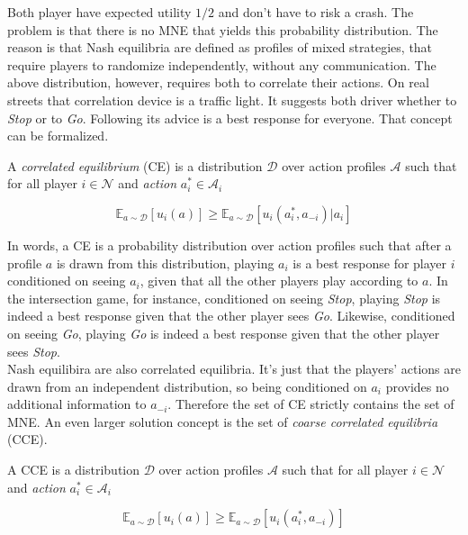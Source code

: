 Both player have expected utility $1/2$ and don't have to risk a crash. The problem is that there is no MNE that yields this probability distribution. The reason is that Nash equilibria are defined as profiles of mixed strategies, that require players to randomize independently, without any
communication. The above distribution, however, requires both to correlate their actions. On real streets that correlation device is a traffic light. It suggests both driver whether to \textit{Stop} or to \textit{Go}. Following its advice is a best response for everyone. That concept can be formalized. 

\begin{definition}\label{def:CE}
    A \textit{correlated equilibrium} (CE) is a distribution $\mathcal{D}$ over action profiles $\mathcal{A}$ such that for all player $i \in \mathcal{N}$ and \textit{action} $a_{i}^{*} \in \mathcal{A}_i$
    
    \[\mathbb{E}_{a \sim \mathcal{D}}[u_i(a)] \ge \mathbb{E}_{a \sim \mathcal{D}}[u_i(a_{i}^{*},a_{-i})|a_i]\]
\end{definition}

In words, a CE is a probability distribution over action profiles such that after a profile $a$ is drawn from this distribution, playing $a_i$ is a best response for player $i$ conditioned on seeing $a_i$, given that all the other players play according to $a$. In the intersection game, for instance, conditioned on seeing \textit{Stop}, playing \textit{Stop} is indeed a best response given that the other player sees \textit{Go}. Likewise, conditioned on seeing \textit{Go}, playing \textit{Go} is indeed a best response given that the other player sees \textit{Stop}. \\

Nash equilibira are also correlated equilibria. It's just that the players' actions are drawn from an independent distribution, so being conditioned on $a_i$ provides no additional information to $a_{-i}$. Therefore the set of CE strictly contains the set of MNE. An even larger solution concept is the set of \textit{coarse correlated equilibria} (CCE). 

\begin{definition}
    A CCE is a distribution $\mathcal{D}$ over action profiles $\mathcal{A}$ such that for all player $i \in \mathcal{N}$ and \textit{action} $a_{i}^{*} \in \mathcal{A}_i$

    \[\mathbb{E}_{a \sim \mathcal{D}}[u_i(a)] \ge \mathbb{E}_{a \sim \mathcal{D}}[u_i(a_{i}^{*},a_{-i})]\]
\end{definition}

